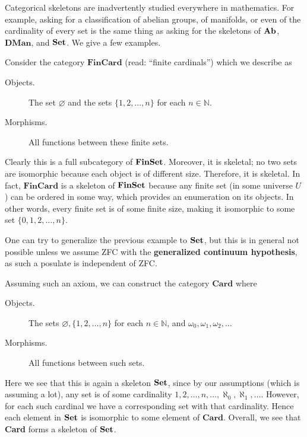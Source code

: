     Categorical skeletons are inadvertently studied everywhere in mathematics. 
    For example, asking for a classification of abelian groups, of manifolds, or 
    even of the cardinality of every set is the same thing as asking for the 
    skeletons of $\operatorname{\mathbf{Ab}}$, $\textbf{DMan}$, and $\operatorname{\mathbf{Set}}$. We give a few 
    examples. 

    \begin{example}
        Consider the category $\textbf{FinCard}$ (read: ``finite cardinals'') which we describe as 
        \begin{description}
            \item[Objects.] The set $\varnothing$ and the sets $\{1, 2, ..., n\}$ for each $n \in \mathbb{N}$.
            \item[Morphisms.] All functions between these finite sets.  
        \end{description}
        Clearly this is a full subcategory of $\operatorname{\mathbf{FinSet}}$. Moreover, it is skeletal; 
        no two sets are isomorphic because each object is of different size. Therefore, it 
        is skeletal. In fact, $\textbf{FinCard}$ is a skeleton 
        of $\operatorname{\mathbf{FinSet}}$ because any finite set (in some universe $U$) 
        can be ordered in some way, which provides an enumeration on its objects.
        In other words, every finite set is of some finite size, making it isomorphic 
        to some set $\{0, 1, 2, \dots, n\}$. 
    \end{example}

    \begin{example}
        One can try to generalize the previous example to $\operatorname{\mathbf{Set}}$, but this 
        is in general not possible unless we assume ZFC with the 
        \textbf{generalized continuum hypothesis}, as such a posulate is independent of ZFC. 
        
        Assuming such an axiom, we can construct the category $\textbf{Card}$
        where 
        \begin{description}
            \item[Objects.] The sets $\varnothing, \{1, 2, \dots, n\}$ for each $n \in \mathbb{N}$, and $\omega_0, \omega_1, \omega_2, \dots$ 
            \item[Morphisms.] All functions between such sets. 
        \end{description}
        Here we see that this is again a skeleton $\operatorname{\mathbf{Set}}$, since by our assumptions 
        (which is assuming a lot), any set is of some cardinality
        $1, 2, \dots, n, \dots, \aleph_0, \aleph_1, \dots$. However, for each such 
        cardinal we have a corresponding set with that cardinality. Hence each element 
        in $\operatorname{\mathbf{Set}}$ is isomorphic to some element of $\textbf{Card}$. Overall, 
        we see that \textbf{Card} forms a skeleton of $\operatorname{\mathbf{Set}}$.
    \end{example}

